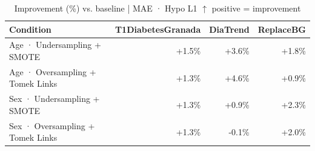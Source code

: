 \begin{table}[htbp]
\centering
\small
\caption{Improvement (\%) vs. baseline  |  MAE · Hypo L1  $\uparrow$ positive = improvement}
\label{tab:delta_mae_tbr_1_family_mechanism_random+guided}
\begin{tabular}{lrrr}
\toprule
\textbf{Condition} & \textbf{T1DiabetesGranada} & \textbf{DiaTrend} & \textbf{ReplaceBG} \\
\midrule
Age · Undersampling + SMOTE & \textcolor{OliveGreen}{+1.5\%} & \textcolor{OliveGreen}{+3.6\%} & \textcolor{OliveGreen}{+1.8\%} \\
Age · Oversampling + Tomek Links & \textcolor{OliveGreen}{+1.3\%} & \textcolor{OliveGreen}{+4.6\%} & \textcolor{OliveGreen}{+0.9\%} \\
\midrule
Sex · Undersampling + SMOTE & \textcolor{OliveGreen}{+1.3\%} & \textcolor{OliveGreen}{+0.9\%} & \textcolor{OliveGreen}{+2.3\%} \\
Sex · Oversampling + Tomek Links & \textcolor{OliveGreen}{+1.3\%} & \textcolor{BrickRed}{-0.1\%} & \textcolor{OliveGreen}{+2.0\%} \\
\bottomrule
\end{tabular}
\end{table}